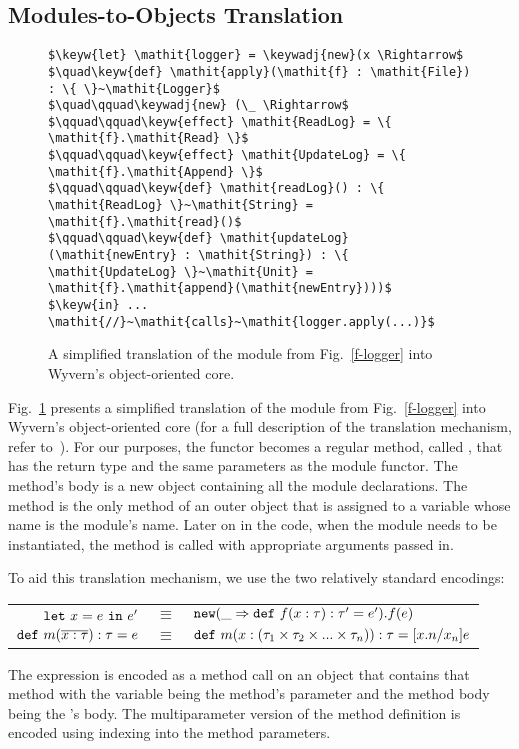 \subsection{Modules-to-Objects Translation}

\begin{figure}[htb]
\begin{lstlisting}
$\keyw{let} \mathit{logger} = \keywadj{new}(x \Rightarrow$
$\quad\keyw{def} \mathit{apply}(\mathit{f} : \mathit{File}) : \{ \}~\mathit{Logger}$
$\quad\qquad\keywadj{new} (\_ \Rightarrow$
$\qquad\qquad\keyw{effect} \mathit{ReadLog} = \{ \mathit{f}.\mathit{Read} \}$
$\qquad\qquad\keyw{effect} \mathit{UpdateLog} = \{ \mathit{f}.\mathit{Append} \}$
$\qquad\qquad\keyw{def} \mathit{readLog}() : \{ \mathit{ReadLog} \}~\mathit{String} = \mathit{f}.\mathit{read}()$
$\qquad\qquad\keyw{def} \mathit{updateLog}(\mathit{newEntry} : \mathit{String}) : \{ \mathit{UpdateLog} \}~\mathit{Unit} = \mathit{f}.\mathit{append}(\mathit{newEntry})))$
$\keyw{in} ... \mathit{//}~\mathit{calls}~\mathit{logger.apply(...)}$
\end{lstlisting}
\caption{A simplified translation of the  module from Fig.~\ref{f-logger} into Wyvern's object-oriented core.}
\label{f-module-translation}
\end{figure}

Fig.~\ref{f-module-translation} presents a simplified translation of the  module from Fig.~\ref{f-logger} into Wyvern's object-oriented core (for a full description of the translation mechanism, refer to~\cite{melicher17}). For our purposes, the functor becomes a regular method, called , that has the return type  and the same parameters as the module functor. The method's body is a new object containing all the module declarations. The  method is the only method of an outer object that is assigned to a variable whose name is the module's name. Later on in the code, when the  module needs to be instantiated, the  method is called with appropriate arguments passed in.

To aid this translation mechanism, we use the two relatively standard encodings:

\begin{minipage}{\linewidth}
{\small
\begin{tabular}{r@{\hskip 5pt}c@{\hskip 5pt}l}
  $\mathtt{let}~ x = e~\mathtt{in}~ e'$ & $\equiv$ & $\mathtt{new} (\_ \Rightarrow \mathtt{def}~ f(x : \tau) : \tau' = e').f(e)$\\%
  $\mathtt{def}~ m(\overline{x : \tau}) : \tau = e$ & $\equiv$ & $\mathtt{def}~ m(x : (\tau_1 \times \tau_2 \times ... \times \tau_n)) : \tau = [x.n/x_n]e$
\end{tabular}
}
\end{minipage}
The  expression is encoded as a method call on an object that contains that method with the  variable being the method's parameter and the method body being the 's body. The multiparameter version of the method definition is encoded using indexing into the method parameters.



